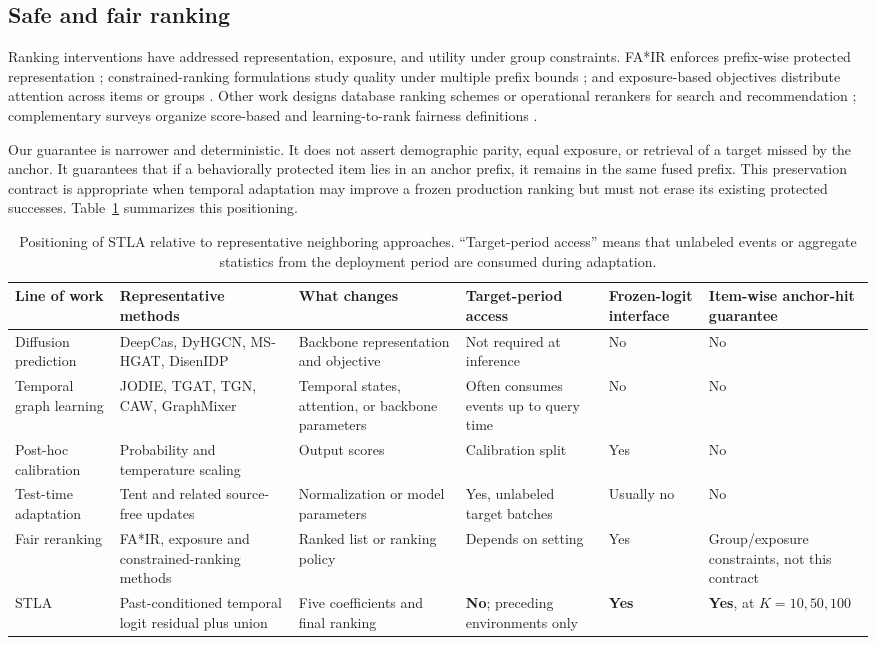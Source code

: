 \documentclass[sigconf,anonymous,review]{acmart}
\newcommand{\method}{\textsc{STLA}\xspace}
\begin{document}
\subsection{Safe and fair ranking}
Ranking interventions have addressed representation, exposure, and utility under group constraints. FA*IR enforces prefix-wise protected representation \cite{zehlike2017fair}; constrained-ranking formulations study quality under multiple prefix bounds \cite{celis2018ranking}; and exposure-based objectives distribute attention across items or groups \cite{biega2018equity,singh2018exposure}. Other work designs database ranking schemes or operational rerankers for search and recommendation \cite{asudeh2019designing,geyik2019fairness}; complementary surveys organize score-based and learning-to-rank fairness definitions \cite{zehlike2022survey,zehlike2022survey2}.

Our guarantee is narrower and deterministic. It does not assert demographic parity, equal exposure, or retrieval of a target missed by the anchor. It guarantees that if a behaviorally protected item lies in an anchor prefix, it remains in the same fused prefix. This preservation contract is appropriate when temporal adaptation may improve a frozen production ranking but must not erase its existing protected successes. Table~\ref{tab:position} summarizes this positioning.

\begin{table}[t]
\caption{Positioning of \method relative to representative neighboring approaches. ``Target-period access'' means that unlabeled events or aggregate statistics from the deployment period are consumed during adaptation.}
\label{tab:position}
\centering
\scriptsize
\begin{tabular}{@{}p{2.4cm}p{3.9cm}p{2.5cm}p{2.2cm}p{2.0cm}p{2.5cm}@{}}
\toprule
Line of work & Representative methods & What changes & Target-period access & Frozen-logit interface & Item-wise anchor-hit guarantee\\
\midrule
Diffusion prediction & DeepCas, DyHGCN, MS-HGAT, DisenIDP & Backbone representation and objective & Not required at inference & No & No\\
Temporal graph learning & JODIE, TGAT, TGN, CAW, GraphMixer & Temporal states, attention, or backbone parameters & Often consumes events up to query time & No & No\\
Post-hoc calibration & Probability and temperature scaling & Output scores & Calibration split & Yes & No\\
Test-time adaptation & Tent and related source-free updates & Normalization or model parameters & Yes, unlabeled target batches & Usually no & No\\
Fair reranking & FA*IR, exposure and constrained-ranking methods & Ranked list or ranking policy & Depends on setting & Yes & Group/exposure constraints, not this contract\\
\method & Past-conditioned temporal logit residual plus union & Five coefficients and final ranking & \textbf{No}; preceding environments only & \textbf{Yes} & \textbf{Yes}, at $K=10,50,100$\\
\bottomrule
\end{tabular}
\end{table}
\end{document}
